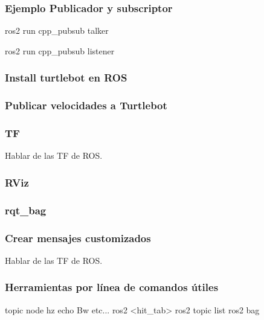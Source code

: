 \begin{frame}[fragile]
	\frametitle{Ejemplo Publicador y subscriptor}
	
    
%            
%            
	
	ros2 run cpp\_pubsub talker
	
	ros2 run cpp\_pubsub listener
	
\end{frame}


\begin{frame}
	\frametitle{Install turtlebot en ROS}
	
\end{frame}

\begin{frame}
	\frametitle{Publicar velocidades a Turtlebot}
	
\end{frame}

\begin{frame}
	\frametitle{TF}
	Hablar de las TF de ROS.
	
\end{frame}

\begin{frame}
	\frametitle{RViz}

	
\end{frame}

\begin{frame}
    \frametitle{rqt\_bag}

    
\end{frame}

\begin{frame}
	\frametitle{Crear mensajes customizados}
	Hablar de las TF de ROS.
	
\end{frame}

\begin{frame}
	\frametitle{Herramientas por línea de comandos útiles}
    topic node hz echo Bw etc...
    ros2 <hit\_tab>
    ros2 topic list
    ros2 bag 
	
\end{frame}


